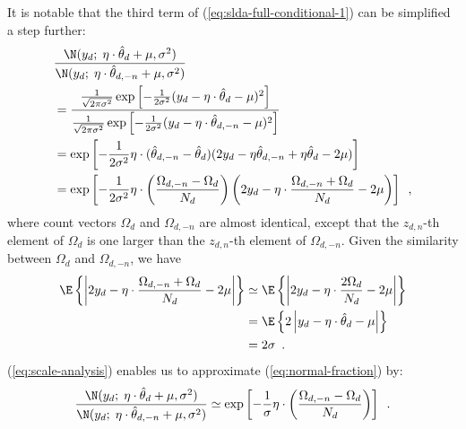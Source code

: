 It is notable that the third term of
(\ref{eq:slda-full-conditional-1}) can be simplified a step further:
\begin{equation}
  \label{eq:normal-fraction}
  \begin{split}
  &\frac{
    \N(y_d;\;\eta\cdot\hat{\theta}_d+\mu,\sigma^2)
  }{
    \N(y_d;\;\eta\cdot\hat{\theta}_{d,-n}+\mu,\sigma^2)
  }
  \\
  &=
  \frac{
    \frac{1}{\sqrt{2\pi\sigma^2}} \exp\left[ -\frac{1}{2\sigma^2} ( y_d - \eta\cdot\hat{\theta}_d - \mu )^2 \right]
  }{
    \frac{1}{\sqrt{2\pi\sigma^2}} \exp\left[ -\frac{1}{2\sigma^2} ( y_d - \eta\cdot\hat{\theta}_{d,-n} - \mu )^2 \right]
  }
  \\
  &=
  \exp\left[
    -\frac{1}{2\sigma^2}
    \eta \cdot (\hat{\theta}_{d,-n} - \hat{\theta}_d)
    ( 2y_d - \eta\hat{\theta}_{d,-n} + \eta\hat{\theta}_d - 2\mu )  \right]
  \\
  &=
  \exp\left[
    -\frac{1}{2\sigma^2}
    \eta \cdot \left(\frac{\Omega_{d,-n} - \Omega_d}{N_d} \right)
    \left( 2y_d - \eta\cdot\frac{\Omega_{d,-n} + \Omega_d}{N_d} - 2\mu \right)
  \right]
  \enspace,
  \end{split}
\end{equation}
where count vectors $\Omega_d$ and $\Omega_{d,-n}$ are almost
identical, except that the $z_{d,n}$-th element of $\Omega_d$ is one
larger than the $z_{d,n}$-th element of $\Omega_{d,-n}$.  Given the
similarity between $\Omega_d$ and $\Omega_{d,-n}$, we have
\begin{equation}
  \label{eq:scale-analysis}
  \begin{split}
  \E\left\{ \left| 2y_d - \eta\cdot\frac{\Omega_{d,-n}+\Omega_d}{N_d}-2\mu \right| \right\}
  &\simeq
  \E\left\{ \left| 2y_d - \eta\cdot\frac{2\Omega_d}{N_d}-2\mu \right| \right\}
  \\
  &=
  \E\left\{ 2 \left| y_d - \eta\cdot\hat{\theta}_d - \mu \right| \right\}
  \\
  &=
  2\sigma
  \enspace.
  \end{split}
\end{equation}
(\ref{eq:scale-analysis}) enables us to approximate
(\ref{eq:normal-fraction}) by:
\begin{equation}
  \label{eq:normal-fraction-1}
  \frac{
    \N(y_d;\;\eta\cdot\hat{\theta}_d+\mu,\sigma^2)
  }{
    \N(y_d;\;\eta\cdot\hat{\theta}_{d,-n}+\mu,\sigma^2)
  }
  \simeq
  \exp\left[
    -\frac{1}{\sigma}
    \eta \cdot \left(\frac{\Omega_{d,-n} - \Omega_d}{N_d} \right)
  \right]
  \enspace.
\end{equation}
